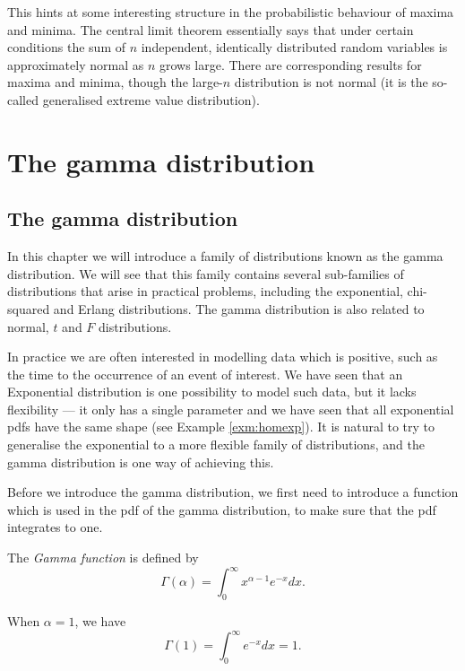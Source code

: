 \documentclass[]{book}
\theoremstyle{definition}
\theoremstyle{definition}
\theoremstyle{definition}
\theoremstyle{remark}
\let\BeginKnitrBlock\begin \let\EndKnitrBlock\end
\begin{document}
This hints at some interesting structure in the probabilistic behaviour
of maxima and minima. The central limit theorem essentially says that
under certain conditions the sum of \(n\) independent, identically
distributed random variables is approximately normal as \(n\) grows
large. There are corresponding results for maxima and minima, though the
large-\(n\) distribution is not normal (it is the so-called generalised
extreme value distribution).

\chapter{The gamma distribution}\label{gamma}

\section{The gamma distribution}\label{the-gamma-distribution}

In this chapter we will introduce a family of distributions known as the
gamma distribution. We will see that this family contains several
sub-families of distributions that arise in practical problems,
including the exponential, chi-squared and Erlang distributions. The
gamma distribution is also related to normal, \(t\) and \(F\)
distributions.

In practice we are often interested in modelling data which is positive,
such as the time to the occurrence of an event of interest. We have seen
that an Exponential distribution is one possibility to model such data,
but it lacks flexibility --- it only has a single parameter and we have
seen that all exponential pdfs have the same shape (see Example
\ref{exm:homexp}). It is natural to try to generalise the exponential to
a more flexible family of distributions, and the gamma distribution is
one way of achieving this.

Before we introduce the gamma distribution, we first need to introduce a
function which is used in the pdf of the gamma distribution, to make
sure that the pdf integrates to one.

\BeginKnitrBlock{definition}[Gamma function]
\protect\hypertarget{def:unnamed-chunk-44}{}{\label{def:unnamed-chunk-44}
\iffalse (Gamma function) \fi{} }The \emph{Gamma function} is defined by
\[\Gamma(\alpha) = \int_0^\infty x^{\alpha - 1} e^{-x} dx.\]
\EndKnitrBlock{definition}

When \(\alpha = 1\), we have
\[\Gamma(1) = \int_0^\infty e^{-x} dx = 1.\]
\end{document}
